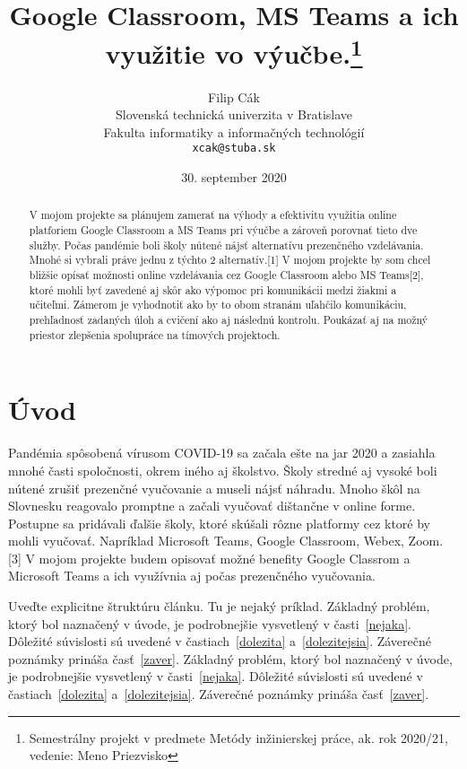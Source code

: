 \documentclass[10pt,twoside,slovak,a4paper]{article}
\title{Google Classroom,  MS Teams a ich využitie vo výučbe.\thanks{Semestrálny projekt v predmete Metódy inžinierskej práce, ak. rok 2020/21, vedenie: Meno Priezvisko}} %
\author{Filip Cák\\[2pt]
	{\small Slovenská technická univerzita v Bratislave}\\
	{\small Fakulta informatiky a informačných technológií}\\
	{\small \texttt{xcak@stuba.sk}}
	}
\date{\small 30. september 2020} %
\begin{document}
\maketitle

\begin{abstract}
V mojom projekte sa plánujem zamerať na výhody a efektivitu využitia online platforiem Google Classroom a MS Teams pri výučbe a zároveň porovnať tieto dve služby. Počas pandémie boli školy nútené nájsť alternatívu prezenčného vzdelávania. Mnohé si vybrali práve jednu z týchto 2 alternatív.[1] V mojom projekte by som chcel bližšie opísať možnosti online vzdelávania cez Google Classroom alebo MS Teams[2], ktoré mohli byť zavedené aj skôr ako výpomoc pri komunikácii medzi žiakmi a učiteľmi. Zámerom je vyhodnotiť ako by to obom stranám uľahčilo komunikáciu, prehľadnosť zadaných úloh a cvičení ako aj následnú kontrolu. Poukázať aj na možný priestor zlepšenia spolupráce na tímových projektoch.
\end{abstract}



\section{Úvod}

Pandémia spôsobená vírusom COVID-19 sa začala ešte na jar 2020 a zasiahla mnohé časti spoločnosti, okrem iného aj školstvo. Školy stredné aj vysoké boli nútené zrušiť prezenčné vyučovanie a museli nájsť náhradu. Mnoho škôl na Slovnesku reagovalo promptne a začali vyučovať dištančne v online forme. Postupne sa pridávali ďalšie školy, ktoré skúšali rôzne platformy cez ktoré by mohli vyučovať. Napríklad Microsoft Teams, Google Classroom, Webex, Zoom. [3] V mojom projekte budem opisovať možné benefity Google Classrom a Microsoft Teams a ich využívnia aj počas prezenčného vyučovania.
 


Uveďte explicitne štruktúru článku. Tu je nejaký príklad.
Základný problém, ktorý bol naznačený v úvode, je podrobnejšie vysvetlený v časti~\ref{nejaka}.
Dôležité súvislosti sú uvedené v častiach~\ref{dolezita} a~\ref{dolezitejsia}.
Záverečné poznámky prináša časť~\ref{zaver}.
Základný problém, ktorý bol naznačený v úvode, je podrobnejšie vysvetlený v časti~\ref{nejaka}.
Dôležité súvislosti sú uvedené v častiach~\ref{dolezita} a~\ref{dolezitejsia}.
Záverečné poznámky prináša časť~\ref{zaver}.
\end{document}

